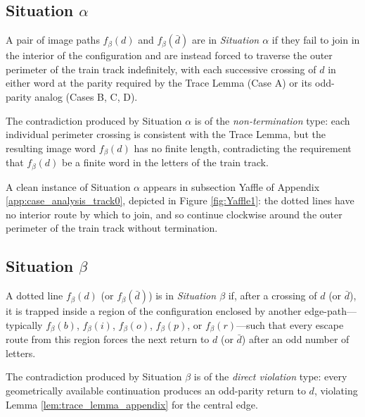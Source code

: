\subsection{Situation $\alpha$}
\label{ssec:situation_alpha_appendix}

\begin{definition}
\label{def:situation_alpha}
A pair of image paths $f_\beta(d)$ and $f_\beta(\bar{d})$ are in \emph{Situation $\alpha$} if they fail to join in the interior of the configuration and are instead forced to traverse the outer perimeter of the train track indefinitely, with each successive crossing of $d$ in either word at the parity required by the Trace Lemma (Case A) or its odd-parity analog (Cases B, C, D).
\end{definition}

The contradiction produced by Situation $\alpha$ is of the \emph{non-termination} type: each individual perimeter crossing is consistent with the Trace Lemma, but the resulting image word $f_\beta(d)$ has no finite length, contradicting the requirement that $f_\beta(d)$ be a finite word in the letters of the train track.

A clean instance of Situation $\alpha$ appears in subsection Yaffle of Appendix \ref{app:case_analysis_track0}, depicted in Figure \ref{fig:Yaffle1}: the dotted lines have no interior route by which to join, and so continue clockwise around the outer perimeter of the train track without termination.

\subsection{Situation $\beta$}
\label{ssec:situation_beta_appendix}

\begin{definition}
\label{def:situation_beta}
A dotted line $f_\beta(d)$ (or $f_\beta(\bar{d})$) is in \emph{Situation $\beta$} if, after a crossing of $d$ (or $\bar{d}$), it is trapped inside a region of the configuration enclosed by another edge-path---typically $f_\beta(b)$, $f_\beta(i)$, $f_\beta(o)$, $f_\beta(p)$, or $f_\beta(r)$---such that every escape route from this region forces the next return to $d$ (or $\bar{d}$) after an odd number of letters.
\end{definition}

The contradiction produced by Situation $\beta$ is of the \emph{direct violation} type: every geometrically available continuation produces an odd-parity return to $d$, violating Lemma \ref{lem:trace_lemma_appendix} for the central edge.

